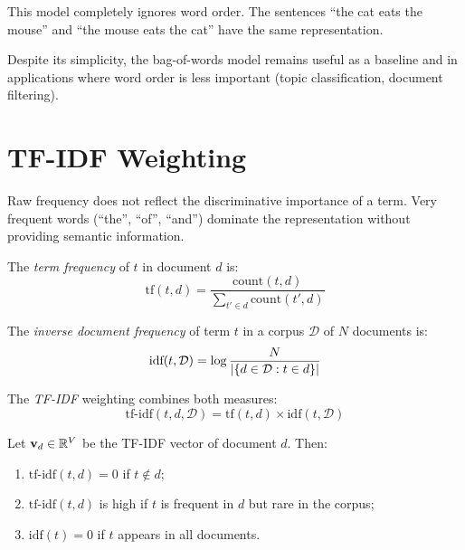 This model completely ignores word order. The sentences ``the cat eats the
mouse'' and ``the mouse eats the cat'' have the same representation.

\begin{remark}
Despite its simplicity, the bag-of-words model remains useful as a baseline and
in applications where word order is less important (topic classification,
document filtering).
\end{remark}

\section{TF-IDF Weighting}
\label{sec:rep:tfidf}

Raw frequency does not reflect the discriminative importance of a term.
Very frequent words (``the'', ``of'', ``and'') dominate the representation
without providing semantic information.

\begin{definition}
The \emph{term frequency} of $t$ in document $d$ is:
\[
\text{tf}(t, d) = \frac{\text{count}(t, d)}{\sum_{t' \in d} \text{count}(t', d)}
\]
\end{definition}

\begin{definition}
The \emph{inverse document frequency} of term $t$ in a corpus $\mathcal{D}$
of $N$ documents is:
\[
\text{idf}(t, \mathcal{D}) = \log \frac{N}{\left| \{d \in \mathcal{D} : t \in d\} \right|}
\]
\end{definition}

\begin{definition}[TF-IDF]
The \emph{TF-IDF} weighting combines both measures:
\[
\text{tf-idf}(t, d, \mathcal{D}) = \text{tf}(t, d) \times \text{idf}(t, \mathcal{D})
\]
\end{definition}

\begin{theorem}
Let $\mathbf{v}_d \in \mathbb{R}^V$ be the TF-IDF vector of document $d$. Then:
\begin{enumerate}
    \item $\text{tf-idf}(t, d) = 0$ if $t \notin d$;
    \item $\text{tf-idf}(t, d)$ is high if $t$ is frequent in $d$ but rare in
          the corpus;
    \item $\text{idf}(t) = 0$ if $t$ appears in all documents.
\end{enumerate}
\end{theorem}

